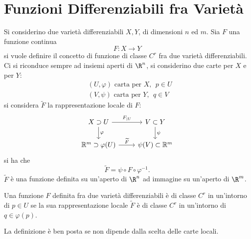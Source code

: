 \documentclass[10pt, letterpaper]{report}
\begin{document}
\section{Funzioni Differenziabili fra Varietà}
Si considerino due varietà differenziabili $X,Y$, di dimensioni $n$ ed $m$. Sia $F$ una funzione continua\begin{equation}
    F:X\rightarrow Y
\end{equation}
si vuole definire il concetto di funzione di classe $C^r$ fra due varietà differenziabili. Ci si riconduce sempre ad insiemi aperti di $\R^n$, si considerino due carte per $X$ e per $Y$:\begin{align}
    &(U,\varphi) \text{ carta per }X, \ \ p\in U\\ 
    &(V,\psi) \text{ carta per }Y, \ \ q\in V
\end{align}
si considera $\tilde F$ la rappresentazione locale di $F$:
\[
\begin{tikzcd}
X \supset U \arrow[r, "F_{|U}"] \arrow[d, "\varphi"] & V \subset Y \arrow[d, "\psi"] \\
\mathbb{R}^m \supset \varphi(U) \arrow[r, "\widetilde{F}"] & \psi(V) \subset \mathbb{R}^m
\end{tikzcd}
\]
si ha che\begin{equation}
    \tilde F = \psi\circ F\circ\varphi^{-1}.
\end{equation}
$\tilde F$ è una funzione definita su un'aperto di $\R^n$ ad immagine su un'aperto di $\R^m$. 
\begin{definizione}\label{def:func_diff}
    Una funzione $F$ definita fra due varietà differenziabili è di classe $C^r$ in un'intorno di $p\in U$ se la sua rappresentazione locale $\tilde F$ è di classe $C^r$ in un'intorno di $q\in \varphi(p)$.
\end{definizione}
La definizione è ben posta se non dipende dalla scelta delle carte locali.
\end{document}
